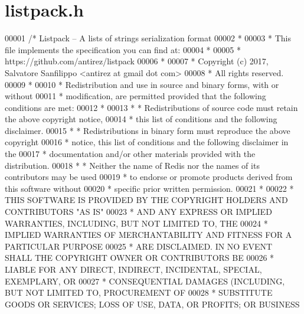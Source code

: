 \hypertarget{listpack_8h_source}{}\section{listpack.\+h}
\label{listpack_8h_source}

\begin{DoxyCode}
00001 \textcolor{comment}{/* Listpack -- A lists of strings serialization format}
00002 \textcolor{comment}{ *}
00003 \textcolor{comment}{ * This file implements the specification you can find at:}
00004 \textcolor{comment}{ *}
00005 \textcolor{comment}{ *  https://github.com/antirez/listpack}
00006 \textcolor{comment}{ *}
00007 \textcolor{comment}{ * Copyright (c) 2017, Salvatore Sanfilippo <antirez at gmail dot com>}
00008 \textcolor{comment}{ * All rights reserved.}
00009 \textcolor{comment}{ *}
00010 \textcolor{comment}{ * Redistribution and use in source and binary forms, with or without}
00011 \textcolor{comment}{ * modification, are permitted provided that the following conditions are met:}
00012 \textcolor{comment}{ *}
00013 \textcolor{comment}{ *   * Redistributions of source code must retain the above copyright notice,}
00014 \textcolor{comment}{ *     this list of conditions and the following disclaimer.}
00015 \textcolor{comment}{ *   * Redistributions in binary form must reproduce the above copyright}
00016 \textcolor{comment}{ *     notice, this list of conditions and the following disclaimer in the}
00017 \textcolor{comment}{ *     documentation and/or other materials provided with the distribution.}
00018 \textcolor{comment}{ *   * Neither the name of Redis nor the names of its contributors may be used}
00019 \textcolor{comment}{ *     to endorse or promote products derived from this software without}
00020 \textcolor{comment}{ *     specific prior written permission.}
00021 \textcolor{comment}{ *}
00022 \textcolor{comment}{ * THIS SOFTWARE IS PROVIDED BY THE COPYRIGHT HOLDERS AND CONTRIBUTORS "AS IS"}
00023 \textcolor{comment}{ * AND ANY EXPRESS OR IMPLIED WARRANTIES, INCLUDING, BUT NOT LIMITED TO, THE}
00024 \textcolor{comment}{ * IMPLIED WARRANTIES OF MERCHANTABILITY AND FITNESS FOR A PARTICULAR PURPOSE}
00025 \textcolor{comment}{ * ARE DISCLAIMED. IN NO EVENT SHALL THE COPYRIGHT OWNER OR CONTRIBUTORS BE}
00026 \textcolor{comment}{ * LIABLE FOR ANY DIRECT, INDIRECT, INCIDENTAL, SPECIAL, EXEMPLARY, OR}
00027 \textcolor{comment}{ * CONSEQUENTIAL DAMAGES (INCLUDING, BUT NOT LIMITED TO, PROCUREMENT OF}
00028 \textcolor{comment}{ * SUBSTITUTE GOODS OR SERVICES; LOSS OF USE, DATA, OR PROFITS; OR BUSINESS}

\end{DoxyCode}

